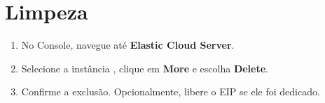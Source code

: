 \documentclass[portuguese]{guide}
\begin{document}
\section{Limpeza}

\begin{objectives}
\end{objectives}

\stepbystep
\begin{enumerate}
  \item No Console, navegue até \textbf{Elastic Cloud Server}.
  \item Selecione a instância , clique em \textbf{More} e
        escolha \textbf{Delete}.
  \item Confirme a exclusão. Opcionalmente, libere o EIP se ele foi dedicado.
\end{enumerate}

\end{document}
